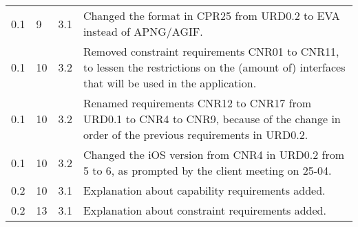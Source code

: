 \begin{tabular}[!]{|l|l|l|p{11cm}|}
   0.1 & 9 & 3.1 & Changed the format in CPR25 from URD0.2 to EVA instead of APNG$/$AGIF. \\
  0.1 & 10 & 3.2 & Removed constraint requirements CNR01 to CNR11, to lessen the restrictions on the (amount of) interfaces that will be used in the application. \\
   0.1 & 10 & 3.2 & Renamed requirements CNR12 to CNR17 from URD0.1 to CNR4 to CNR9, because of the change in order of the previous requirements in URD0.2. \\
  0.1 & 10 & 3.2 & Changed the iOS version from CNR4 in URD0.2 from 5 to 6, as prompted by the client meeting on 25-04. \\ 
  0.2 & 10 & 3.1 & Explanation about capability requirements added. \\ 
    0.2 & 13 & 3.1 & Explanation about constraint requirements added. \\ 
    \hline
\end{tabular} 